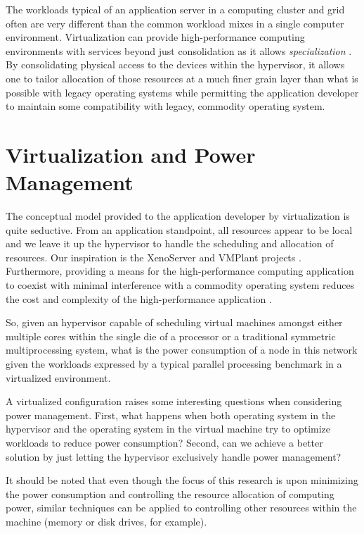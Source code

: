 \documentclass[preprint]{sigplanconf}
\begin{document}
The workloads typical of an application server in a computing cluster and grid
often are very different than the common workload mixes in a single computer
environment.   Virtualization can provide high-performance computing
environments with services beyond just consolidation as it allows
\emph{specialization} \cite{Mergen2006}.  By consolidating physical access to
the devices within the hypervisor, it allows one to tailor allocation of those
resources at a much finer grain layer than what is possible with legacy
operating systems while permitting the application developer to maintain some
compatibility with legacy, commodity operating system.

\section{Virtualization and Power Management}
\label{sec:PowerMgt}
The conceptual model provided to the application developer by virtualization
is quite seductive.  From an application standpoint, all resources appear to
be local and we leave it up the hypervisor to handle the scheduling and
allocation of resources.  Our inspiration is the XenoServer \cite{Fraser2003}
and VMPlant projects \cite{Krsul2004}.   Furthermore, providing a means for
the high-performance computing application to coexist with minimal
interference with a commodity operating system reduces the cost and complexity
of the high-performance application \cite{Mergen2006}.

So, given an hypervisor capable of scheduling virtual machines amongst either
multiple cores within the single die of a processor or a traditional symmetric
multiprocessing system, what is the power consumption of a node in this network
given the workloads expressed by a typical parallel processing benchmark in a
virtualized environment.

A virtualized configuration raises some interesting questions when considering
power management.   First, what happens when both operating system in the
hypervisor and the operating system in the virtual machine try to optimize
workloads to reduce power consumption?  Second, can we achieve a better
solution by just letting the hypervisor exclusively handle power management?

It should be noted that even though the focus of this research is upon
minimizing the power consumption and controlling the resource allocation of
computing power, similar techniques can be applied to controlling other
resources within the machine (memory or disk drives, for example).
\end{document}
